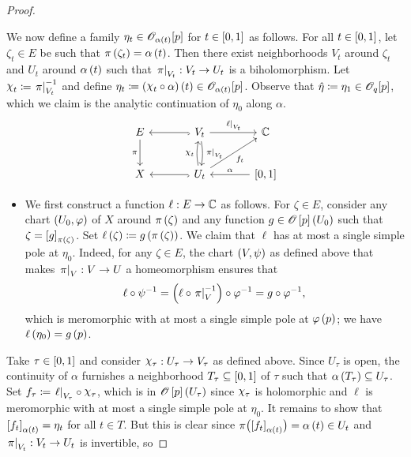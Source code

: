 \documentclass[../Moduli_Spaces_of_Riemann_Surfaces.tex]{subfiles}
\begin{document}
\begin{proof}
\begin{itemize}
        \end{itemize}
        We now define a family $\eta_t\in\mathscr{O}_{\alpha\left(t\right)}\!\left[p\right]$ for $t\in\left[0,1\right]$ as follows. For all $t\in\left[0,1\right]$, let $\zeta_t\in E$ be such that $\pi\left(\zeta_t\right)=\alpha\left(t\right)$. Then there exist neighborhoods $V_t$ around $\zeta_t$ and $U_t$ around $\alpha\left(t\right)$ such that $\left.\pi\right|_{V_t}:V_t\to U_t$ is a biholomorphism. Let $\cchi_t\coloneqq\l.\pi\r|_{V_t}^{-1}$ and define $\eta_t\coloneqq\l(\cchi_t\circ\alpha\r)\l(t\r)\in\HOLO_{\alpha\l(t\r)}\!\l[p\r]$. Observe that $\hat{\eta}\coloneqq\eta_1\in\mathscr{O}_q\!\left[p\right]$, which we claim is the analytic continuation of $\eta_0$ along $\alpha$.
        \begin{equation*}
            \begin{tikzcd}[column sep=0.5in, row sep=0.3in]
                E \ar[d, "\pi"'] & V_t \ar[l, hook] \ar[r, "\l.\ell\r|_{V_t}"] \ar[d, "\l.\pi\r|_{V_t}", bend left=10] & \C \\
                X & U_t \ar[l, hook] \ar[u, "\cchi_t", bend left=10] \ar[ur, "f_t"'] & \l[0,1\r] \ar[l, "\alpha"']
            \end{tikzcd}
        \end{equation*}
        \begin{itemize}
            \item We first construct a function $\ell:E\to\mathbb{C}$ as follows. For $\zeta\in E$, consider any chart $\left(U_0,\varphi\right)$ of $X$ around $\pi\left(\zeta\right)$ and any function $g\in\mathscr{O}\left[p\right]\left(U_0\right)$ such that $\zeta=\left[g\right]_{\pi\left(\zeta\right)}$. Set $\ell\left(\zeta\right)\coloneqq g\left(\pi\left(\zeta\right)\right)$. We claim that $\ell$ has at most a single simple pole at $\eta_0$. Indeed, for any $\zeta\in E$, the chart $\left(V,\psi\right)$ as defined above that makes $\left.\pi\right|_V:V\to U$ a homeomorphism ensures that
                \begin{equation*}
                    \ell\circ\psi^{-1}=\left(\ell\circ\left.\pi\right|_V^{-1}\right)\circ\varphi^{-1}=g\circ\varphi^{-1},
                \end{equation*}
                which is meromorphic with at most a single simple pole at $\varphi\left(p\right)$; we have $\ell\left(\eta_0\right)=g\left(p\right)$.
        \end{itemize}
        Take $\tau\in\left[0,1\right]$ and consider $\cchi_\tau:U_\tau\to V_\tau$ as defined above. Since $U_\tau$ is open, the continuity of $\alpha$ furnishes a neighborhood $T_\tau\subseteq\left[0,1\right]$ of $\tau$ such that $\alpha\left(T_\tau\right)\subseteq U_\tau$. Set $f_\tau\coloneqq\l.\ell\r|_{V_\tau}\circ\cchi_\tau$, which is in $\mathscr{O}\left[p\right]\left(U_\tau\right)$ since $\cchi_\tau$ is holomorphic and $\ell$ is meromorphic with at most a single simple pole at $\eta_0$. It remains to show that $\left[f_t\right]_{\alpha\left(t\right)}=\eta_t$ for all $t\in T$. But this is clear since $\pi\bigl(\left[f_t\right]_{\alpha\left(t\right)}\bigr)=\alpha\left(t\right)\in U_t$ and $\left.\pi\right|_{V_t}:V_t\to U_t$ is invertible, so

\end{proof}
\end{document}
